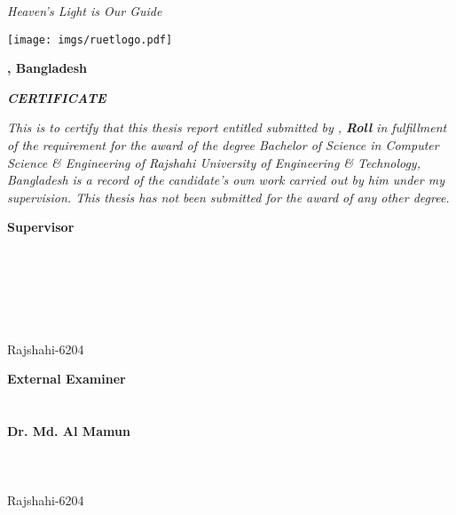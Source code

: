 \documentclass[document.tex]{subfiles}
\begin{document}

\begin{center}
\textit{Heaven's Light is Our Guide}
\vspace{1cm}

\texttt{[image: imgs/ruetlogo.pdf]}

\vspace{1cm}
\textbf{{\fontsize{12pt}{0.5cm} \selectfont \dept}}

\vspace{0.5cm}
\textbf{{\fontsize{14pt}{0.5cm}\selectfont \ruet, Bangladesh}}

\vspace{0.5cm}
\textbf{{\fontsize{16pt}{0.5cm}\selectfont \textit{CERTIFICATE}}}

\vspace{1cm}

\end{center}

\noindent \textit{This is to certify that this thesis report entitled \textbf{\thesistitle} submitted by \textbf{\authorname}, \textbf{Roll \authorroll} \thinspace in fulfillment of the requirement for the award of the degree Bachelor of Science in Computer Science \& Engineering of Rajshahi University of Engineering \& Technology, Bangladesh is a record of the candidate's own work carried out by him under my supervision. This thesis has not been submitted for the award of any other degree.}

\vspace{1.5cm}
\noindent
	\begin{minipage}{.4\textwidth}
		\textbf{{\fontsize{12pt}{0.5cm}Supervisor}}\\
		\vline\\
		\text{---------------------------}\\
		\textbf{\fontsize{12pt}{0.5cm}\thesissupervisor}\\
		\text{\fontsize{12pt}{0.5cm}\thesissupervisordesignation}\\
		\deptT\\
		\ruet\\
		Rajshahi-6204
	\end{minipage}%
\hspace{2.1cm}
	\noindent
	\begin{minipage}{.4\textwidth}
		\textbf{{\fontsize{12pt}{0.5cm}External Examiner}}\\
		\vline\\
		\text{---------------------------}\\
		\textbf{\fontsize{12pt}{0.5cm}Dr. Md. Al Mamun}\\
		\\
		\deptT\\
		\ruet\\
		Rajshahi-6204
	\end{minipage}%
\vspace{1cm}
\clearpage
\end{document}
